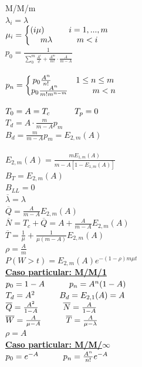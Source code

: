 \begin{minipage}{.22\textwidth}
	M/M/m \\
	$\lambda_i=\lambda$ \\
	$\mu_i = \left \{  \begin{matrix} (i\mu) \hskip 3em  i=1,...,m \\
			m\lambda \hskip 3em m<i\end{matrix}  \right .$ \\
	$p_0 = \frac{1}{\sum_0^m{\frac{A^i}{i!}}+\frac{A^m}{m!}\cdot\frac{A}{m-A}}$ \\ \\
	$p_n = \left \{  \begin{matrix} p_0\frac{A^n}{n!} \hskip 3em 1\le{n}\le{m} \\
			p_0\frac{A^n}{m!m^{n-m}} \hskip 3em m<n\end{matrix}  \right .$ \\
\end{minipage}
\vfill\null
\columnbreak
\begin{minipage}{.22\textwidth}
	$T_0=A=T_c \hskip 3em T_p=0$ \\
	$T_d=A\cdot{\frac{m}{m-A}{p_m}}$ \\
	$B_d=\frac{m}{m-A}{p_m} = E_{2,m}{(A)}$ \\ \\
	$E_{2,m}(A)=\frac{m{E_{1,m}(A)}}{m-A[1-{E_{1,m}(A)}]}$ \\
	$B_T=E_{2,m}(A)$ \\
	$B_{LL}=0$ \\
	$\overline{\lambda}=\lambda$ \\
	$\overline{Q}=\frac{A}{m-A}E_{2,m}(A)$ \\
	$\overline{N}=T_c+\overline{Q}=A+\frac{A}{m-A}E_{2,m}(A)$ \\
	$\overline{T}=\frac{1}{\mu}+\frac{1}{\mu(m-A)}E_{2,m}(A)$ \\
	$\rho=\frac{A}{m}$ \\
	$P(W > t) =E_{2,m}(A) e^{-(1-\rho)m\mu{t}}$ \\
	{\bf \underline{Caso particular: M/M/1}} \\
	$p_0=1-A \hskip 3em p_n=A^n(1-A)$ \\
	$T_d=A^2 \hskip 3em B_d=E_{2,1}(A)=A$ \\
	$\overline{Q}=\frac{A^2}{1-A} \hskip 3em \overline{N}=\frac{A}{1-A}$ \\
	$\overline{W}=\frac{A}{\mu-A} \hskip 3em \overline{T}=\frac{A}{\mu-\lambda}$ \\
	$\rho=A$ \\
	{\bf \underline{Caso particular: M/M/$\infty$}} \\
	$p_0=e^{-A} \hskip 3em p_n=\frac{A^n}{n!}{e^{-A}}$ \\
\end{minipage}
